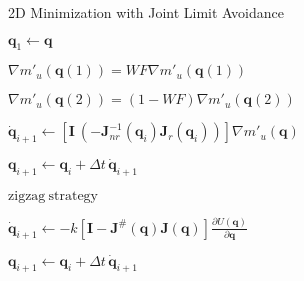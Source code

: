 \begin{algorithm}[H]
	\caption{2D Minimization with Joint Limit Avoidance}
	\label{alg:2D_alg_JLA}
	\begin{algorithmic}[1]
		\State $\mathbf{q}_1 \leftarrow \mathbf{q} $
		
		
	
		\State	$\nabla m'_u(\mathbf{q}(1)) = WF \nabla m'_u(\mathbf{q}(1))$
		\label{alg:JLA:wf_1}
		
		\State	$\nabla m'_u(\mathbf{q}(2)) = (1-WF) \nabla m'_u(\mathbf{q}(2))$
		\label{alg:JLA:wf_2}
		
		\State $\dot{\mathbf{q}}_{i+1} \leftarrow  \left[\mathbf{I} \ (-\mathbf{J}_{nr}^{-1}(\mathbf{q}_i) \mathbf{J}_r(\mathbf{q}_i))  \right ]  \nabla m'_u(\mathbf{q}) $ 
		\label{alg:JLA:projector}
		
		
		\State $\mathbf{q}_{i+1} \leftarrow \mathbf{q}_i + \Delta t \, \dot{\mathbf{q}}_{i+1}$
		
		\State $\mathrm{zigzag \ strategy}$ 
		

		
		

		
		
		
		
		
		\State $\dot{\mathbf{q}}_{i+1} \leftarrow -k \left[\mathbf{I}-\mathbf{J}^{\#}(\mathbf{q})\mathbf{J}(\mathbf{q})\right]  \frac{\partial {U(\mathbf{q})}}{\partial {\mathbf{q}}}	$ \label{alg:JLA:repulsive}
		
		\State $\mathbf{q}_{i+1} \leftarrow \mathbf{q}_i + \Delta t \, \dot{\mathbf{q}}_{i+1}$
		

\end{algorithmic}
\end{algorithm}
